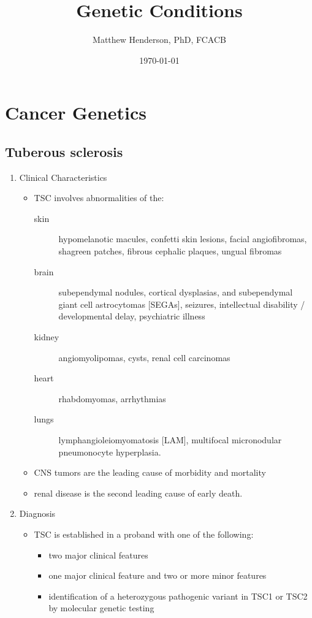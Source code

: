 \documentclass[12pt]{scrartcl}
\author{Matthew Henderson, PhD, FCACB}
\date{\today}
\title{Genetic Conditions}
\begin{document}
\maketitle
\setcounter{tocdepth}{2}
\tableofcontents


\section{Cancer Genetics}
\label{sec:org8ffcc1a}
\subsection{Tuberous sclerosis}
\label{sec:orgc9cff85}
\begin{enumerate}
\item Clinical Characteristics
\label{sec:org2a9c733}
\begin{itemize}
\item TSC involves abnormalities of the:
\begin{description}
\item[{skin}] hypomelanotic macules, confetti skin lesions, facial
angiofibromas, shagreen patches, fibrous cephalic plaques,
ungual fibromas
\item[{brain}] subependymal nodules, cortical dysplasias, and
subependymal giant cell astrocytomas [SEGAs], seizures,
intellectual disability / developmental delay,
psychiatric illness
\item[{kidney}] angiomyolipomas, cysts, renal cell carcinomas
\item[{heart}] rhabdomyomas, arrhythmias
\item[{lungs}] lymphangioleiomyomatosis [LAM], multifocal micronodular
pneumonocyte hyperplasia.
\end{description}
\item CNS tumors are the leading cause of morbidity and mortality
\item renal disease is the second leading cause of early death.
\end{itemize}

\item Diagnosis
\label{sec:orgec1110a}
\begin{itemize}
\item TSC is established in a proband with one of the following:
\begin{itemize}
\item two major clinical features
\item one major clinical feature and two or more minor features
\item identification of a heterozygous pathogenic variant in TSC1 or
TSC2 by molecular genetic testing
\end{itemize}
\end{itemize}


\end{enumerate}
\end{document}
